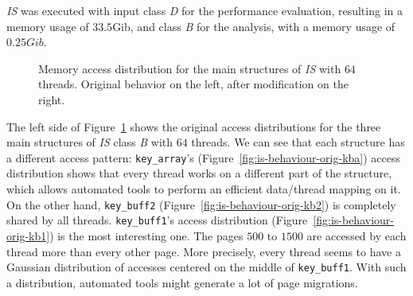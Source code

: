 \emph{IS} was executed with input class \emph{D} for the performance
evaluation, resulting in a memory usage of $33.5$Gib, and class \emph{B} for
the analysis, with a memory usage of $0.25Gib$.

\begin{figure}[htb]
    \centering


    \caption{Memory access distribution for the main structures of
        \emph{IS} with $64$ threads. Original behavior on the left, after
    modification on the right.}
    \label{fig:is-behaviour}

\end{figure}

The left side of Figure~\ref{fig:is-behaviour} shows the original access distributions for the
three main structures of \emph{IS} class \emph{B} with $64$ threads. We can see that
each structure has a different access pattern: \texttt{key\_array}'s
(Figure~\ref{fig:is-behaviour-orig-kba}) access distribution shows that every
thread works on a different part of the structure, which allows automated
tools to perform an efficient data/thread mapping on it. On the other hand, \texttt{key\_buff2}
(Figure~\ref{fig:is-behaviour-orig-kb2}) is completely shared by all threads.
\texttt{key\_buff1}'s access distribution (Figure~\ref{fig:is-behaviour-orig-kb1})
is the most interesting one. The pages $500$ to $1500$ are
accessed by each thread more than every other page. More precisely, every
thread seems to have a Gaussian distribution of accesses centered on the
middle of \texttt{key\_buff1}. With such a distribution, automated tools might
generate a lot of page migrations.

